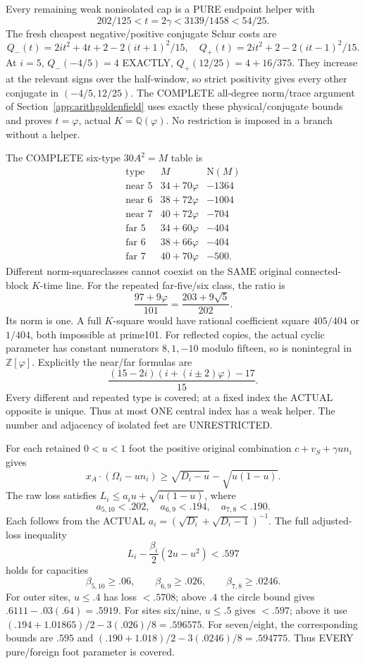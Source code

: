 \documentclass[11pt]{article}
\begin{document}
Every remaining weak nonisolated cap is a PURE
endpoint helper with
\[
 202/125<t=2\gamma<3139/1458<54/25.
\]
The fresh cheapest negative/positive conjugate
Schur costs are
\[
 Q_-(t)=2it^2+4t+2-2(it+1)^2/15,\quad
 Q_+(t)=2it^2+2-2(it-1)^2/15 .
\]
At \(i=5\), \(Q_-(-4/5)=4\) EXACTLY,
\(Q_+(12/25)=4+16/375\).
They increase at the relevant signs over the
half-window, so strict positivity gives every
other conjugate in \((-4/5,12/25)\).
The COMPLETE all-degree norm/trace argument
of Section~\ref{app:arithgoldenfield} uses exactly
these physical/conjugate bounds and proves
\(t=\varphi\), actual \(K=\mathbb Q(\varphi)\).
No restriction is imposed in a branch without
a helper.

The COMPLETE six-type \(30A^2=M\) table is
\[
\begin{array}{c|c|r}
 \text{type}&M&\mathrm N(M)\\ \hline
 \text{near }5&34+70\varphi&-1364\\
 \text{near }6&38+72\varphi&-1004\\
 \text{near }7&40+72\varphi&-704\\
 \text{far }5&34+60\varphi&-404\\
 \text{far }6&38+66\varphi&-404\\
 \text{far }7&40+70\varphi&-500 .
\end{array}
\]
Different norm-squareclasses cannot coexist on
the SAME original connected-block \(K\)-time line.
For the repeated far-five/six class, the ratio is
\[
                         {\frac{97+9\varphi}{101}}
                              ={\frac{203+9\sqrt5}{202}}.
\]
Its norm is one.
A full \(K\)-square would have rational
coefficient square \(405/404\) or \(1/404\),
both impossible at prime101.
For reflected copies, the actual cyclic parameter
has constant numerators \(8,1,-10\) modulo fifteen,
so is nonintegral in \(\mathbb Z[\varphi]\).
Explicitly the near/far formulas are
\[
 {\frac{(15-2i)(i+(i\pm2)\varphi)-17}{15}}.
\]
Every different and repeated type is covered;
at a fixed index the ACTUAL opposite is unique.
Thus at most ONE central index has a weak helper.
The number and adjacency of isolated feet are
UNRESTRICTED.

For each retained \(0<u<1\) foot the positive
original combination
\(c+v_S+\gamma u n_i\) gives
\[
 x_A\cdot(\Omega_i-un_i)\ge
                    \sqrt{D_i-u}-\sqrt{u(1-u)} .
\]
The raw loss satisfies
\(L_i\le a_i u+\sqrt{u(1-u)}\), where
\[
 a_{5,10}<.202,\quad a_{6,9}<.194,\quad
 a_{7,8}<.190 .
\]
Each follows from the ACTUAL
\(a_i=(\sqrt{D_i}+\sqrt{D_i-1})^{-1}\).
The full adjusted-loss inequality
\[
                 L_i-{\frac{\beta_i}{2}}(2u-u^2)<.597
\]
holds for capacities
\[
 \beta_{5,10}\ge.06,\qquad
 \beta_{6,9}\ge.026,\qquad
 \beta_{7,8}\ge.0246 .
\]
For outer sites, \(u\le.4\) has loss \(<.5708\);
above \(.4\) the circle bound gives
\(.6111-.03(.64)=.5919\).
For sites six/nine, \(u\le.5\) gives \(<.597\);
above it use
\((.194+1.01865)/2-3(.026)/8=.596575\).
For seven/eight, the corresponding bounds are
\(.595\) and
\((.190+1.018)/2-3(.0246)/8=.594775\).
Thus EVERY pure/foreign foot parameter is covered.
\end{document}
